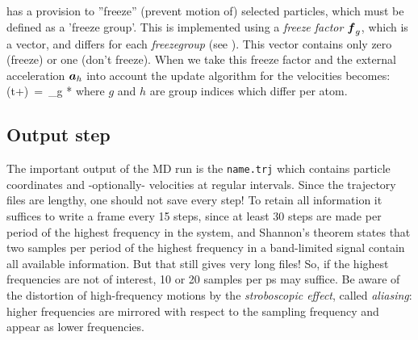 {\gromacs} has a provision to ''freeze''  (prevent motion of) selected
particles, which must be defined as a 'freeze group'. This is implemented
using a {\em freeze factor $\mbox{\boldmath ${f}$}_g$}, which is a vector, and differs for each
{\em freezegroup} (see ). This vector contains only
zero (freeze) or one (don't freeze).
When we take this freeze factor and the external acceleration $\mbox{\boldmath ${a}$}_h$ into 
account the update algorithm for the velocities becomes:
\beq
{}(t+\hdt)~=~_g * \lambda * 
\eeq
where $g$ and $h$ are group indices which differ per atom.

\subsection{Output step}
The important output of the MD run is the {\em
{}} \verb'name.trj' which contains particle coordinates
and -optionally- velocities at regular intervals. Since the trajectory
files are lengthy, one should not save every step! To retain all
information it suffices to write a frame every 15 steps, since at
least 30 steps are made per period of the highest frequency in the
system, and Shannon's  theorem states that two samples per
period of the highest frequency in a band-limited signal contain all
available information. But that still gives very long files! So, if
the highest frequencies are not of interest, 10 or 20 samples per ps
may suffice. Be aware of the distortion of high-frequency motions by
the {\em stroboscopic effect}, called {\em aliasing}: higher frequencies
are  mirrored with respect to the sampling frequency and appear as
lower frequencies. 


